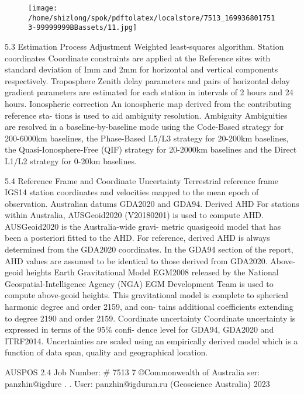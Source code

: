 \documentclass[a4paper,12pt]{article}
\begin{document}
\begin{figure}[h]

\texttt{[image: /home/shizlong/spok/pdftolatex/localstore/7513\_1699368017513-99999999BBassets/11.jpg]}

\centering

\end{figure}

    5.3 Estimation Process         Adjustment    Weighted least-squares algorithm.         Station coordinates    Coordinate constraints are applied at the Reference sites with  standard deviation of Imm and 2mm for horizontal and vertical  components respectively.         Troposphere    Zenith delay parameters and pairs of horizontal delay gradient  parameters are estimated for each station in intervals of 2 hours  and 24 hours.         Ionospheric correction    An ionospheric map derived from the contributing reference sta-  tions is used to aid ambiguity resolution.         Ambiguity              Ambiguities are resolved in a baseline-by-baseline mode using the  Code-Based strategy for 200-6000km baselines, the Phase-Based  L5/L3 strategy for 20-200km baselines, the Quasi-Ionosphere-Free  (QIF) strategy for 20-2000km baselines and the Direct L1/L2  strategy for 0-20km baselines.          

\vspace{10pt}

    5.4 Reference Frame and Coordinate Uncertainty         Terrestrial reference  frame    IGS14 station coordinates and velocities mapped to the mean  epoch of observation.         Australian datums    GDA2020 and GDA94.         Derived AHD    For stations within Australia, AUSGeoid2020 (V20180201) is used  to compute AHD. AUSGeoid2020 is the Australia-wide gravi-  metric quasigeoid model that has been a posteriori fitted to the  AHD. For reference, derived AHD is always determined from the  GDA2020 coordinates. In the GDA94 section of the report, AHD  values are assumed to be identical to those derived from GDA2020.         Above-geoid heights    Earth Gravitational Model EGM2008 released by the National  Geospatial-Intelligence Agency (NGA) EGM Development Team  is used to compute above-geoid heights. This gravitational model  is complete to spherical harmonic degree and order 2159, and con-  tains additional coefficients extending to degree 2190 and order  2159.         Coordinate uncertainty              Coordinate uncertainty is expressed in terms of the 95\% confi-  dence level for GDA94, GDA2020 and ITRF2014. Uncertainties  are scaled using an empirically derived model which is a function  of data span, quality and geographical location.          

\vspace{10pt}

         AUSPOS 2.4 Job Number: \# 7513 7 ©Commonwealth of Australia    ser: panzhin@igdure . .  User: panzhin@igduran.ru (Geoscience Australia) 2023 

\vspace{10pt}

\par

\vspace{10pt}
\end{document}
